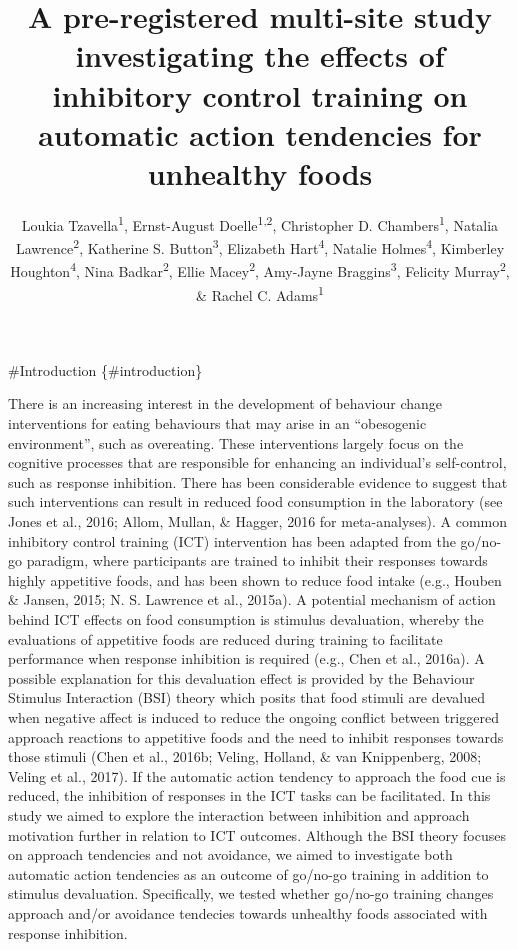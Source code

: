 \documentclass[man,floatsintext]{apa6}
\title{A pre-registered multi-site study investigating the effects of inhibitory control training on automatic action tendencies for unhealthy foods}
\author{Loukia Tzavella\textsuperscript{1}, Ernst-August Doelle\textsuperscript{1,2}, Christopher D. Chambers\textsuperscript{1}, Natalia Lawrence\textsuperscript{2}, Katherine S. Button\textsuperscript{3}, Elizabeth Hart\textsuperscript{4}, Natalie Holmes\textsuperscript{4}, Kimberley Houghton\textsuperscript{4}, Nina Badkar\textsuperscript{2}, Ellie Macey\textsuperscript{2}, Amy-Jayne Braggins\textsuperscript{3}, Felicity Murray\textsuperscript{2}, \& Rachel C. Adams\textsuperscript{1}}
\date{}
\affiliation{
\vspace{0.5cm}
\textsuperscript{1} Cardiff University Brain Research Imaging Centre, CF24 4HQ, UK\\\textsuperscript{2} School of Psychology, University of Exeter, EX4 4QG, UK\\\textsuperscript{3} Department of Psychology, University of Bath, BS2 7AY, UK\\\textsuperscript{4} School of Psychology, Cardiff University, CF10 3AT, UK}
\begin{document}
\maketitle

\#Introduction \{\#introduction\}

\par

There is an increasing interest in the development of behaviour change interventions for eating behaviours that may arise in an \enquote{obesogenic environment}, such as overeating. These interventions largely focus on the cognitive processes that are responsible for enhancing an individual's self-control, such as response inhibition. There has been considerable evidence to suggest that such interventions can result in reduced food consumption in the laboratory (see Jones et al., 2016; Allom, Mullan, \& Hagger, 2016 for meta-analyses). A common inhibitory control training (ICT) intervention has been adapted from the go/no-go paradigm, where participants are trained to inhibit their responses towards highly appetitive foods, and has been shown to reduce food intake (e.g., Houben \& Jansen, 2015; N. S. Lawrence et al., 2015a). A potential mechanism of action behind ICT effects on food consumption is stimulus devaluation, whereby the evaluations of appetitive foods are reduced during training to facilitate performance when response inhibition is required (e.g., Chen et al., 2016a). A possible explanation for this devaluation effect is provided by the Behaviour Stimulus Interaction (BSI) theory which posits that food stimuli are devalued when negative affect is induced to reduce the ongoing conflict between triggered approach reactions to appetitive foods and the need to inhibit responses towards those stimuli (Chen et al., 2016b; Veling, Holland, \& van Knippenberg, 2008; Veling et al., 2017). If the automatic action tendency to approach the food cue is reduced, the inhibition of responses in the ICT tasks can be facilitated. In this study we aimed to explore the interaction between inhibition and approach motivation further in relation to ICT outcomes. Although the BSI theory focuses on approach tendencies and not avoidance, we aimed to investigate both automatic action tendencies as an outcome of go/no-go training in addition to stimulus devaluation. Specifically, we tested whether go/no-go training changes approach and/or avoidance tendecies towards unhealthy foods associated with response inhibition.

\par
\end{document}
